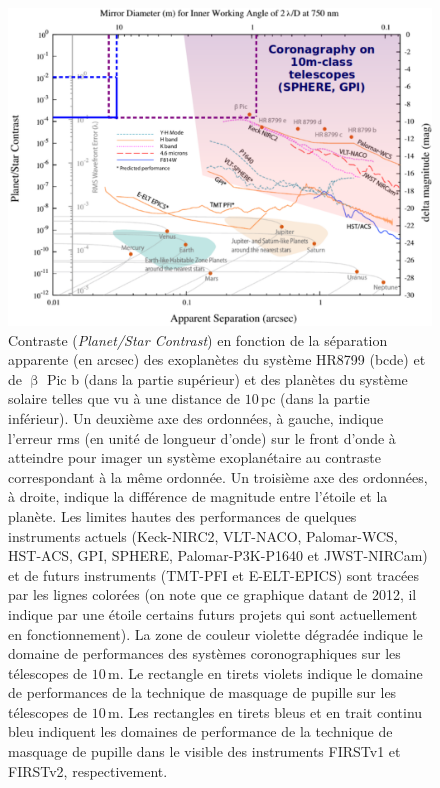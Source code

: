 \begin{figure}[ht!]
    \centering
    \includegraphics[width=\figwidth]{Figure_Chap1/Mawet2012_ContrastVSSeparation_InstruPerformances_02.png}
    \caption[Contraste en fonction de la séparation apparente de certaines exoplanètes imagées et des planètes du système solaire.]{Contraste (\textit{Planet/Star Contrast}) en fonction de la séparation apparente (en arcsec) des exoplanètes du système HR8799 (bcde) et de $\upbeta$ Pic b (dans la partie supérieur) et des planètes du système solaire telles que vu à une distance de $10 \,$pc (dans la partie inférieur). Un deuxième axe des ordonnées, à gauche, indique l'erreur rms (en unité de longueur d'onde) sur le front d'onde à atteindre pour imager un système exoplanétaire au contraste correspondant à la même ordonnée. Un troisième axe des ordonnées, à droite, indique la différence de magnitude entre l'étoile et la planète. Les limites hautes des performances de quelques instruments actuels (Keck-NIRC2, VLT-NACO, Palomar-WCS, HST-ACS, GPI, SPHERE, Palomar-P3K-P1640 et JWST-NIRCam) et de futurs instruments (TMT-PFI et E-ELT-EPICS) sont tracées par les lignes colorées (on note que ce graphique datant de 2012, il indique par une étoile certains futurs projets qui sont actuellement en fonctionnement). La zone de couleur violette dégradée indique le domaine de performances des systèmes coronographiques sur les télescopes de $10 \,$m. Le rectangle en tirets violets indique le domaine de performances de la technique de masquage de pupille sur les télescopes de $10 \,$m. Les rectangles en tirets bleus et en trait continu bleu indiquent les domaines de performance de la technique de masquage de pupille dans le visible des instruments FIRSTv1 et FIRSTv2, respectivement.}
    \label{fig:ContrastSeparation}
\end{figure}

